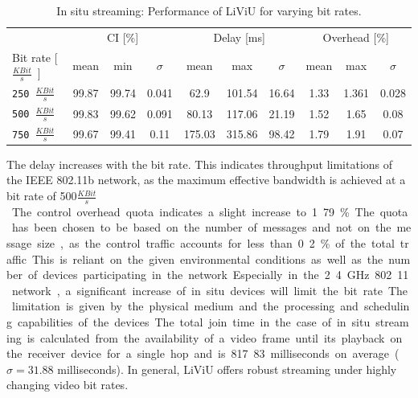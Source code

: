\begin{table}[h]
	\centering
	\caption{In situ streaming: Performance of LiViU for varying bit rates.}
	\begin{tabular}{l ccc ccc ccc}%
		&  \multicolumn{3}{c}{CI [\%]} &   \multicolumn{3}{c}{Delay [ms]} &\multicolumn{3}{c}{Overhead [\%]}  \\
		Bit rate [\unit{$\frac{KBit}{s}$}]& mean & min & $\sigma$ & mean & max & $\sigma$ & mean & max & $\sigma$ \\ \toprule
		\texttt{250 \unit{$\frac{KBit}{s}$}}& 99.87 & 99.74 & 0.041 & 62.9 & 101.54 & 16.64 & 1.33 & 1.361& 0.028\\
		\texttt{500 \unit{$\frac{KBit}{s}$}}& 99.83 & 99.62 & 0.091& 80.13 &117.06 & 21.19 & 1.52 & 1.65 & 0.08 \\
		\texttt{750 \unit{$\frac{KBit}{s}$}}& 99.67 & 99.41 &0.11 & 175.03 &315.86 & 98.42 & 1.79 & 1.91 & 0.07 \\ 
		\bottomrule
	\end{tabular}
	\label{tab:530_eval_static_results}
\end{table} 

The delay increases with the bit rate. 
This indicates throughput limitations of the IEEE 802.11b network, as the maximum effective bandwidth is achieved at a bit rate of 500\unit{$\frac{KBit}{s}$}.
The control overhead quota indicates a slight increase to 1.79\%.
The quota has been chosen to be based on the number of messages and not on the message size, as the control traffic accounts for less than 0.2\% of the total traffic.

This is reliant on the given environmental conditions as well as the number of devices participating in the network.
Especially in the 2.4 \unit{GHz} 802.11 network, a significant increase of in situ devices will limit the bit rate.
The limitation is given by the physical medium and the processing and scheduling capabilities of the devices.
The total join time in the case of in situ streaming is calculated from the availability of a video frame until its playback on the receiver device for a single hop and is 817.83 milliseconds on average ($\sigma = 31.88$ milliseconds). 
In general, \ac{LiViU} offers robust streaming under highly changing video bit rates. 
